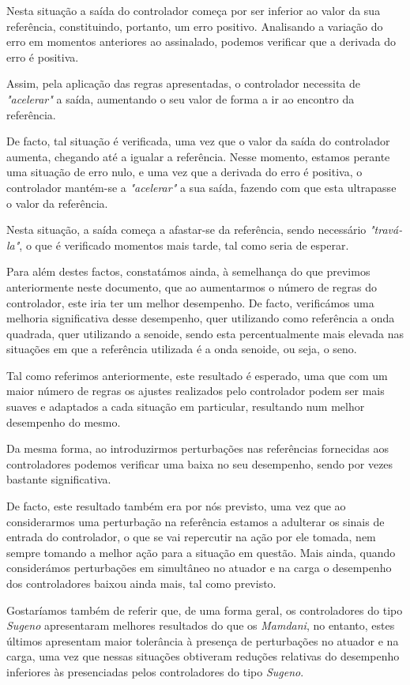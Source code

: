 \documentclass{article}
\begin{document}
Nesta situação a saída do controlador começa por ser inferior ao valor da sua referência, constituindo, portanto, um erro positivo. Analisando a variação do erro em momentos anteriores ao assinalado, podemos verificar que a derivada do erro é positiva.

Assim, pela aplicação das regras apresentadas, o controlador necessita de \emph{"acelerar"} a saída, aumentando o seu valor de forma a ir ao encontro da referência. 

De facto, tal situação é verificada, uma vez que o valor da saída do controlador aumenta, chegando até a igualar a referência. Nesse momento, estamos perante uma situação de erro nulo, e uma vez que a derivada do erro é positiva, o controlador mantém-se a \emph{"acelerar"} a sua saída, fazendo com que esta ultrapasse o valor da referência.

Nesta situação, a saída começa a afastar-se da referência, sendo necessário \emph{"travá-la"}, o que é verificado momentos mais tarde, tal como seria de esperar.

Para além destes factos, constatámos ainda, à semelhança do que previmos anteriormente neste documento, que ao aumentarmos o número de regras do controlador, este iria ter um melhor desempenho. De facto, verificámos uma melhoria significativa desse desempenho, quer utilizando como referência a onda quadrada, quer utilizando a senoide, sendo esta percentualmente mais elevada nas situações em que a referência utilizada é a onda senoide, ou seja, o seno.

Tal como referimos anteriormente, este resultado é esperado, uma que com um maior número de regras os ajustes realizados pelo controlador podem ser mais suaves e adaptados a cada situação em particular, resultando num melhor desempenho do mesmo.

Da mesma forma, ao introduzirmos perturbações nas referências fornecidas aos controladores podemos verificar uma baixa no seu desempenho, sendo por vezes bastante significativa.

De facto, este resultado também era por nós previsto, uma vez que ao considerarmos uma perturbação na referência estamos a adulterar os sinais de entrada do controlador, o que se vai repercutir na ação por ele tomada, nem sempre tomando a melhor ação para a situação em questão. Mais ainda, quando considerámos perturbações em simultâneo no atuador e na carga o desempenho dos controladores baixou ainda mais, tal como previsto.

Gostaríamos também de referir que, de uma forma geral, os controladores do tipo \emph{Sugeno} apresentaram melhores resultados do que os \emph{Mamdani}, no entanto, estes últimos apresentam maior tolerância à presença de perturbações no atuador e na carga, uma vez que nessas situações obtiveram reduções relativas do desempenho inferiores às presenciadas pelos controladores do tipo \emph{Sugeno}.
\end{document}
